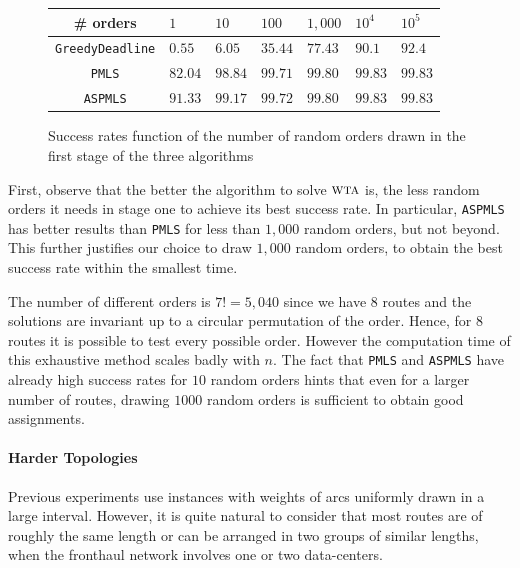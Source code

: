 \documentclass[a4paper,10pt]{journal}
\newcommand\greedydeadline{\texttt{GreedyDeadline}\xspace}
\newcommand\PMLS{\texttt{PMLS}\xspace}
\newcommand\ASPMLS{\texttt{ASPMLS}\xspace}
\newcommand\wta{\textsc{wta}\xspace}
\begin{document}
         \begin{figure}[h] 
       \begin{center}
   \begin{tabularx}{0.8\textwidth}{|c|X|X|X|X|X|X|}
    \hline
    \# orders& $1$ & $10$ & $100$& $1,000$& $10^{4}$&$10^{5}$\\
    \hline
    \greedydeadline & $0.55$ &$6.05$&$35.44$&$77.43$&$90.1$&$92.4$\\
    \hline
    \PMLS & $82.04$ &$98.84$&$99.71$&$99.80$&$99.83$&$99.83$\\
    \hline
    \ASPMLS & $91.33$&$99.17$&$99.72$&$99.80$ &$99.83$&$99.83$\\
    \hline
      \end{tabularx}
      \end{center}
   \caption{Success rates function of the number of random orders drawn in the first stage of the three algorithms}
        \label{fig:randomdrawing}
     \end{figure}

	First, observe that the better the algorithm to solve $\wta$ is, the less random orders it needs in stage one to achieve its best success rate. In particular, \ASPMLS has better results than \PMLS for less than $1,000$ random orders, but not beyond. This further justifies our choice to draw $1,000$ random orders, to obtain the best success rate within the smallest time.

	The number of different orders is $7!= 5,040$ since we have $8$ routes and the solutions are invariant up to a circular permutation of the order. Hence, for $8$ routes it is possible to test every possible order. However the computation time of this exhaustive method scales badly with $n$. The fact that \PMLS and \ASPMLS have already high success rates for $10$ random orders hints that even for a larger number of routes, drawing $1000$ random orders is sufficient to obtain good assignments.


     \paragraph{Harder Topologies}
     
    Previous experiments use instances with weights of arcs uniformly drawn in a large interval. However, it is quite natural to consider that most routes are of roughly the same length or can be arranged in two groups of similar lengths, when the fronthaul network involves one or two data-centers.
    
\end{document}
